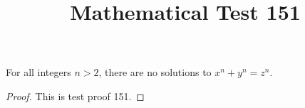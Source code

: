 \documentclass{amsart}
\begin{document}
\title{Mathematical Test 151}
\begin{theorem}
For all integers $n > 2$, there are no solutions to $x^n + y^n = z^n$.
\end{theorem}
\begin{proof}
This is test proof 151.
\end{proof}
\end{document}
